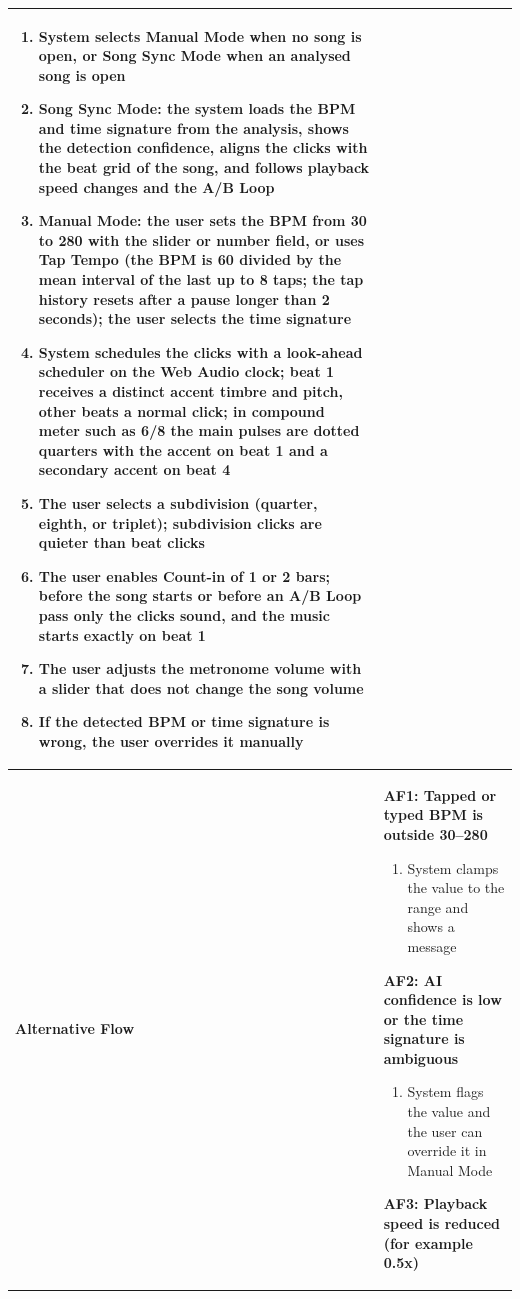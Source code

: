 \documentclass[a4paper]{article}
\newlength{\ucLeft}
\begin{document}
\begin{longtable}{|>{\bfseries}p{\ucLeft}|p{\dimexpr\linewidth-\ucLeft-2\tabcolsep-2\arrayrulewidth}|}
\begin{enumerate}[leftmargin=1.5em, nosep, topsep=2pt, partopsep=0pt, parsep=0pt, after=\strut]
    \item System selects Manual Mode when no song is open, or Song Sync Mode when an analysed song is open
    \item Song Sync Mode: the system loads the BPM and time signature from the analysis, shows the detection confidence, aligns the clicks with the beat grid of the song, and follows playback speed changes and the A/B Loop
    \item Manual Mode: the user sets the BPM from 30 to 280 with the slider or number field, or uses Tap Tempo (the BPM is 60 divided by the mean interval of the last up to 8 taps; the tap history resets after a pause longer than 2 seconds); the user selects the time signature
    \item System schedules the clicks with a look-ahead scheduler on the Web Audio clock; beat 1 receives a distinct accent timbre and pitch, other beats a normal click; in compound meter such as 6/8 the main pulses are dotted quarters with the accent on beat 1 and a secondary accent on beat 4
    \item The user selects a subdivision (quarter, eighth, or triplet); subdivision clicks are quieter than beat clicks
    \item The user enables Count-in of 1 or 2 bars; before the song starts or before an A/B Loop pass only the clicks sound, and the music starts exactly on beat 1
    \item The user adjusts the metronome volume with a slider that does not change the song volume
    \item If the detected BPM or time signature is wrong, the user overrides it manually
\end{enumerate}
\\ \hline
Alternative Flow &
\textbf{AF1: Tapped or typed BPM is outside 30--280}
\begin{enumerate}[leftmargin=1.5em, nosep, topsep=2pt, partopsep=0pt, parsep=0pt, after=\strut]
    \item System clamps the value to the range and shows a message
\end{enumerate}
\textbf{AF2: AI confidence is low or the time signature is ambiguous}
\begin{enumerate}[leftmargin=1.5em, nosep, topsep=2pt, partopsep=0pt, parsep=0pt, after=\strut]
    \item System flags the value and the user can override it in Manual Mode
\end{enumerate}
\textbf{AF3: Playback speed is reduced (for example 0.5x)}

\end{longtable}
\end{document}
